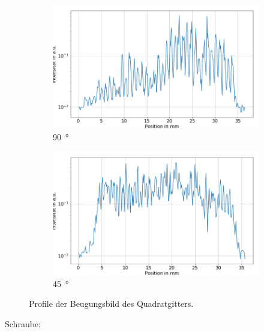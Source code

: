 \documentclass[
	a4paper,
	12pt,
	pagesize,
	ngerman
]{scrartcl}
\begin{document}
	\begin{figure}[H]
        \centering
        \begin{subfigure}[b]{0.475\textwidth}
            \centering
            \includegraphics[width=\textwidth]{img/4/4_waag}
            \caption%
            {\SI{90}{\degree}}
            \label{fig_4_profil_90}
        \end{subfigure}
        \hfill
        \begin{subfigure}[b]{0.475\textwidth}
            \centering
            \includegraphics[width=\textwidth]{img/4/4_diag}
            \caption[]%
            {\SI{45}{\degree}}
            \label{fig_4_profil_45}
        \end{subfigure}
        \caption%
        {
				Profile der Beugungsbild des Quadratgitters.
				}
        \label{fig_4_profil}
    \end{figure}
	\noindent Schraube:
\end{document}
